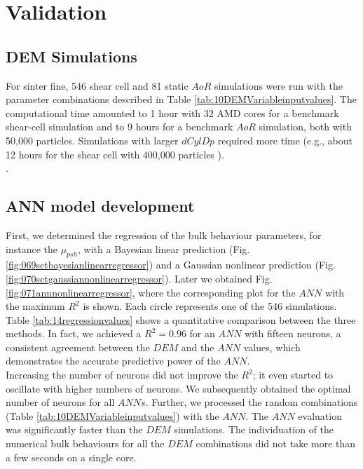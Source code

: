 
\chapter{Validation}
\label{cap:validation}

\section{DEM Simulations}
\label{sec:simulations}

For sinter fine, 546 shear cell and 81 static $AoR$ simulations 
were run with
the parameter combinations described in Table
\ref{tab:10DEMVariableinputvalues}.
The computational time amounted to 1 hour with 32 AMD cores for a benchmark
shear-cell simulation and to 9 hours for a benchmark $AoR$ simulation, both with
50,000 particles.
Simulations with larger $dCylDp$ required more time (e.g., about 12 hours for
the shear cell with 400,000 particles ). \\

.

\section{ANN model development}
\label{sec:annmodeldev}



First, we determined the regression of the bulk behaviour parameters, for
instance the $\mu_{psh}$, 
with a Bayesian linear prediction (Fig.
\ref{fig:069sctbayesianlinearregressor}) and a Gaussian nonlinear prediction
(Fig.  \ref{fig:070sctgaussiannonlinearregressor}). 
Later we obtained Fig.
\ref{fig:071annnonlinearregressor}, where the corresponding plot for the $ANN$ with the maximum $R^2$ is shown. 
Each circle represents one of the 546 simulations.
Table \ref{tab:14regressionvalues} shows a quantitative comparison between the
three methods. 
In fact, 
we achieved a $R^2 = 0.96$ for an $ANN$ with fifteen neurons,
a consistent agreement between the 
$DEM$ and the $ANN$ values, which demonstrates the accurate predictive power of
the $ANN$.\\ 
Increasing the number of neurons did not improve the $R^2$; it even started to
oscillate with higher numbers of neurons.
We subsequently obtained the optimal number of neurons for all $ANNs$.
Further, we processed the random combinations (Table
\ref{tab:10DEMVariableinputvalues}) with the $ANN$.
The $ANN$ evaluation was significantly faster than the $DEM$ simulations. The
individuation of the numerical bulk behaviours for all the $DEM$ combinations
did not take more than a few seconds on a single core.



